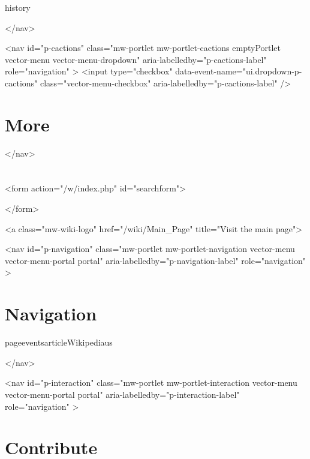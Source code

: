 \documentclass{article}\usepackage{titlesec}
\begin{document}
		
		\begin{itemize}\itemRead\itemEdit\itemView history\end{itemize}
		
	
</nav>

			<nav id="p-cactions" class="mw-portlet mw-portlet-cactions emptyPortlet vector-menu vector-menu-dropdown" aria-labelledby="p-cactions-label" role="navigation" 
	 >
	<input type="checkbox"
		data-event-name="ui.dropdown-p-cactions"
		class="vector-menu-checkbox" aria-labelledby="p-cactions-label" />
	\section{More}
	
		
		\begin{itemize}\end{itemize}
		
	
</nav>

			
	
		\section{}
		<form action="/w/index.php" id="searchform">
			
				
				
				
				
			
		</form>
	


		
	
	

	
		<a class="mw-wiki-logo" href="/wiki/Main\_Page"
			title="Visit the main page">
	
	<nav id="p-navigation" class="mw-portlet mw-portlet-navigation vector-menu vector-menu-portal portal" aria-labelledby="p-navigation-label" role="navigation" 
	 >
	\section{Navigation}
	
		
		\begin{itemize}\itemMain page\itemContents\itemCurrent events\itemRandom article\itemAbout Wikipedia\itemContact us\itemDonate\end{itemize}
		
	
</nav>

	<nav id="p-interaction" class="mw-portlet mw-portlet-interaction vector-menu vector-menu-portal portal" aria-labelledby="p-interaction-label" role="navigation" 
	 >
	\section{Contribute}
	
\end{document}
